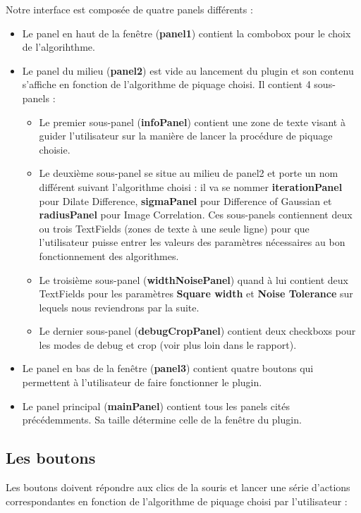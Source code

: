 \documentclass[12pt,a4paper]{report}
\begin{document}
Notre interface est composée de quatre panels différents :
\begin{itemize}

\item Le panel en haut de la fenêtre (\textbf{panel1}) contient la combobox pour le choix de l'algorihthme. 
\item Le panel du milieu (\textbf{panel2}) est vide au lancement du plugin et son contenu s'affiche en fonction de l'algorithme de piquage choisi. Il contient 4 sous-panels :
\begin{itemize}
\item Le premier sous-panel (\textbf{infoPanel}) contient une zone de texte visant à guider l'utilisateur sur la manière de lancer la procédure de piquage choisie. 
\item Le deuxième sous-panel se situe au milieu de panel2 et porte un nom différent suivant l'algorithme choisi : il va se nommer \textbf{iterationPanel} pour Dilate Difference, \textbf{sigmaPanel} pour Difference of Gaussian et \textbf{radiusPanel} pour Image Correlation. Ces sous-panels contiennent deux ou trois TextFields (zones de texte à une seule ligne) pour que l'utilisateur puisse entrer les valeurs des paramètres nécessaires au bon fonctionnement des algorithmes. 
\item Le troisième sous-panel (\textbf{widthNoisePanel}) quand à lui contient deux TextFields pour les paramètres \textbf{Square width} et \textbf{Noise Tolerance} sur lequels nous reviendrons par la suite. 
\item Le dernier sous-panel (\textbf{debugCropPanel}) contient deux checkboxs pour les modes de debug et crop (voir plus loin dans le rapport). 
\end{itemize}
\item Le panel en bas de la fenêtre (\textbf{panel3}) contient quatre boutons qui permettent à l'utilisateur de faire fonctionner le plugin. 
\item Le panel principal (\textbf{mainPanel}) contient tous les panels cités précédemments. Sa taille détermine celle de la fenêtre du plugin. 
\end{itemize}

\subsection{Les boutons}

Les boutons doivent répondre aux clics de la souris et lancer une série d'actions correspondantes en fonction de l'algorithme de piquage choisi par l'utilisateur :
\end{document}
